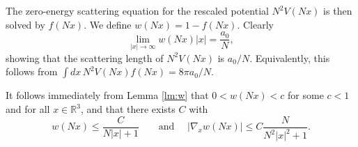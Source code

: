 \documentclass[11pt,a4paper]{article}
\newcommand{\done}{}
\newcommand{\bR}{{\mathbb R}}
\newcommand{\di}{{d}}		%
\newcommand{\ph}{\varphi_t^{(N)}}	%
\begin{document}
The zero-energy scattering equation for the rescaled potential $N^2 V (Nx)$ is then solved by $f(Nx)$. We define $w(Nx) = 1- f(Nx)$. Clearly 
\[ \lim_{|x| \to \infty} w(Nx) |x| = \frac{a_0}{N} ,\]
showing that the scattering length of $N^2 V(Nx)$ is $a_0/N$. Equivalently, this follows from $\int \di x\, N^2V(Nx)f(Nx) = 8\pi a_0/N$.\done

It follows immediately from Lemma \ref{lm:w} that $0 < w(Nx) < c$ for some $c <1$ and for all $x \in \bR^3$, and that there exists $C$ with 
\begin{equation}\label{eq:wN-bd} w(Nx) \leq \frac{C}{N|x| + 1} \qquad \text{and } \quad |\nabla_x w(Nx)| \leq C \frac{N}{N^2 |x|^2 + 1}. \end{equation}

\end{document}
